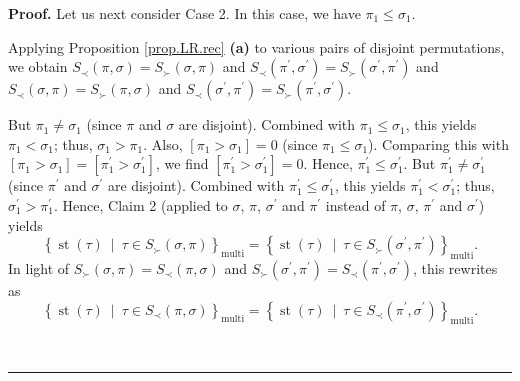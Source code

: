 \documentclass[numbers=enddot,12pt,final,onecolumn,notitlepage]{scrartcl}%
\theoremstyle{definition}
\newenvironment{proof}[1][Proof]{\noindent\textbf{#1.} }{\ \rule{0.5em}{0.5em}}
\newenvironment{verlong}{}{}
\begin{document}
\begin{verlong}
\begin{proof}
Let us next consider Case 2. In this case, we have $\pi_{1}\leq\sigma_{1}$.

Applying Proposition \ref{prop.LR.rec} \textbf{(a)} to various pairs of
disjoint permutations, we obtain $S_{\prec}\left(  \pi,\sigma\right)
=S_{\succ}\left(  \sigma,\pi\right)  $ and $S_{\prec}\left(  \pi^{\prime
},\sigma^{\prime}\right)  =S_{\succ}\left(  \sigma^{\prime},\pi^{\prime
}\right)  $ and $S_{\prec}\left(  \sigma,\pi\right)  =S_{\succ}\left(
\pi,\sigma\right)  $ and $S_{\prec}\left(  \sigma^{\prime},\pi^{\prime
}\right)  =S_{\succ}\left(  \pi^{\prime},\sigma^{\prime}\right)  $.

But $\pi_{1}\neq\sigma_{1}$ (since $\pi$ and $\sigma$ are disjoint). Combined
with $\pi_{1}\leq\sigma_{1}$, this yields $\pi_{1}<\sigma_{1}$; thus,
$\sigma_{1}>\pi_{1}$. Also, $\left[  \pi_{1}>\sigma_{1}\right]  =0$ (since
$\pi_{1}\leq\sigma_{1}$). Comparing this with $\left[  \pi_{1}>\sigma
_{1}\right]  =\left[  \pi_{1}^{\prime}>\sigma_{1}^{\prime}\right]  $, we find
$\left[  \pi_{1}^{\prime}>\sigma_{1}^{\prime}\right]  =0$. Hence, $\pi
_{1}^{\prime}\leq\sigma_{1}^{\prime}$. But $\pi_{1}^{\prime}\neq\sigma
_{1}^{\prime}$ (since $\pi^{\prime}$ and $\sigma^{\prime}$ are disjoint).
Combined with $\pi_{1}^{\prime}\leq\sigma_{1}^{\prime}$, this yields $\pi
_{1}^{\prime}<\sigma_{1}^{\prime}$; thus, $\sigma_{1}^{\prime}>\pi_{1}%
^{\prime}$. Hence, Claim 2 (applied to $\sigma$, $\pi$, $\sigma^{\prime}$ and
$\pi^{\prime}$ instead of $\pi$, $\sigma$, $\pi^{\prime}$ and $\sigma^{\prime
}$) yields%
\[
\left\{  \operatorname*{st}\left(  \tau\right)  \ \mid\ \tau\in S_{\succ
}\left(  \sigma,\pi\right)  \right\}  _{\operatorname*{multi}}=\left\{
\operatorname*{st}\left(  \tau\right)  \ \mid\ \tau\in S_{\succ}\left(
\sigma^{\prime},\pi^{\prime}\right)  \right\}  _{\operatorname*{multi}}.
\]
In light of $S_{\succ}\left(  \sigma,\pi\right)  =S_{\prec}\left(  \pi
,\sigma\right)  $ and $S_{\succ}\left(  \sigma^{\prime},\pi^{\prime}\right)
=S_{\prec}\left(  \pi^{\prime},\sigma^{\prime}\right)  $, this rewrites as
\[
\left\{  \operatorname*{st}\left(  \tau\right)  \ \mid\ \tau\in S_{\prec
}\left(  \pi,\sigma\right)  \right\}  _{\operatorname*{multi}}=\left\{
\operatorname*{st}\left(  \tau\right)  \ \mid\ \tau\in S_{\prec}\left(
\pi^{\prime},\sigma^{\prime}\right)  \right\}  _{\operatorname*{multi}}.
\]



\end{proof}
\end{verlong}
\end{document}
